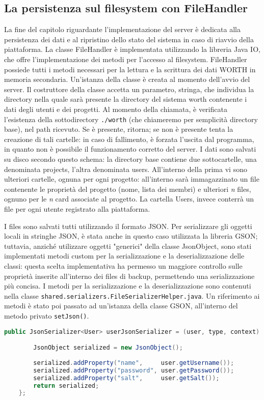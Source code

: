 \documentclass{article}
\begin{document}
\subsection{La persistenza sul filesystem con FileHandler}
La fine del capitolo riguardante l'implementazione del server è dedicata alla persistenza dei dati e al ripristino dello stato del sistema in caso di riavvio della piattaforma.
La classe FileHandler è implementata utilizzando la libreria Java IO, che offre l'implementazione dei metodi per l'accesso al filesystem. FileHandler possiede tutti i metodi necessari per la lettura e la scrittura dei dati WORTH in memoria secondaria. Un'istanza della classe è creata al momento dell'avvio del server. Il costruttore della classe accetta un parametro, stringa, che individua la directory nella quale sarà presente la directory del sistema worth contenente i dati degli utenti e dei progetti. Al momento della chiamata, è verificata l'esistenza della sottodirectory \texttt{./worth} (che chiameremo per semplicità directory base), nel path ricevuto. Se è presente, ritorna; se non è presente tenta la creazione di tali cartelle: in caso di fallimento, è forzata l'uscita dal programma, in quanto non è possibile il funzionamento corretto del server.
I dati sono salvati su disco secondo questo schema: la directory base contiene due sottocartelle, una denominata projects, l'altra denominata users. All'interno della prima vi sono ulteriori cartelle, ognuna per ogni progetto: all'interno sarà immagazzinato un file contenente le proprietà del progetto (nome, lista dei membri) e ulteriori \emph n files, ognuno per le \emph n card associate al progetto. La cartella Users, invece conterrà un file per ogni utente registrato alla piattaforma.\newline

I files sono salvati tutti utilizzando il formato JSON. Per serializzare gli oggetti locali in stringhe JSON, è stata anche in questo caso utilizzata la libreria GSON; tuttavia, anziché utilizzare oggetti "generici" della classe JsonObject, sono stati implementati metodi custom per la serializzazione e la deserializzazione delle classi: questa scelta implementativa ha permesso un maggiore controllo sulle proprietà inserite all'interno dei files di backup, permettendo una serializzazione più concisa. I metodi per la serializzazione e la deserializzazione sono contenuti nella classe \texttt{shared.serializers.FileSerializerHelper.java}. Un riferimento ai metodi è stato poi passato ad un'istanza della classe GSON, all'interno del metodo privato \texttt{setJson()}.
\newline
\begin{lstlisting}[language=Java, caption=Esempio di serializzatore per la classe User]
public JsonSerializer<User> userJsonSerializer = (user, type, context) -> {

        JsonObject serialized = new JsonObject();
        
        serialized.addProperty("name",     user.getUsername());
        serialized.addProperty("password", user.getPassword());
        serialized.addProperty("salt",     user.getSalt());
        return serialized;
    };
\end{lstlisting}
\end{document}
